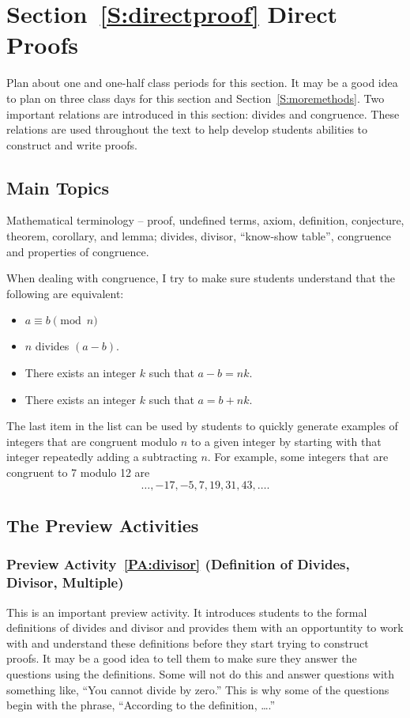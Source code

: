 \section*{Section~\ref{S:directproof} Direct Proofs}
Plan about one and one-half class periods for this section.  It may be a good idea to plan on three class days for this section and Section~\ref{S:moremethods}.  Two important relations are introduced in this section:  divides and congruence.  These relations are used throughout the text to help develop students abilities to construct and write proofs.


\subsection*{Main Topics}
Mathematical terminology -- proof, undefined terms, axiom, definition, conjecture, theorem, corollary, and lemma; divides, divisor, ``know-show table'', congruence and properties of congruence.

When dealing with congruence, I try to make sure students understand that the following are equivalent:
\begin{itemize}
\item $a \equiv b \pmod n$

\item $n$ divides $(a - b)$.

\item There exists an integer $k$ such that $a - b = nk$.

\item There exists an integer $k$ such that $a = b + nk$.
\end{itemize}
The last item in the list can be used by students to quickly generate examples of integers that are congruent modulo $n$ to a given integer by starting with that integer repeatedly adding a subtracting $n$.  For example, some integers that are congruent to 7 modulo 12 are
\[
\ldots, -17, -5, 7, 19, 31, 43, \ldots .
\]

\subsection*{The Preview Activities}
\subsubsection*{Preview Activity~\ref{PA:divisor} (Definition of Divides, Divisor, Multiple)} 
This is an important preview activity.  It introduces students to the formal definitions of divides and divisor and provides them with an opportuntity to work with and understand these definitions before they start trying to construct proofs.  It may be a good idea to tell them to make sure they answer the questions using the definitions.  Some will not do this and answer questions with something like, ``You cannot divide by zero.''  This is why some of the questions begin with the phrase, ``According to the definition, \ldots.''

